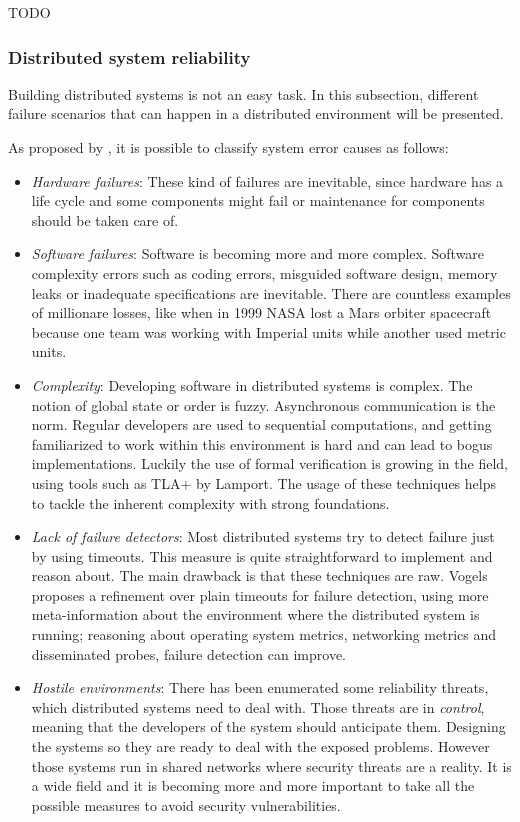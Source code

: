 TODO


\subsubsection{Distributed system reliability}

Building distributed systems is not an easy task. In this subsection, different
failure scenarios that can happen in a distributed environment will be presented.

As proposed by \cite{GuideReliable}, it is possible to classify system error
causes as follows:
\begin{itemize}
\item \textit{Hardware failures}: These kind of failures are inevitable, since
  hardware has a life cycle and some components might fail or maintenance for
  components should be taken care of.
\item \textit{Software failures}: Software is becoming more and more complex.
  Software complexity errors such as coding errors, misguided software design,
  memory leaks or inadequate specifications are inevitable. There are countless
  examples of millionare losses, like when in 1999 NASA lost a Mars orbiter
  spacecraft because one team was working with Imperial units while another used
  metric units.
\item \textit{Complexity}: Developing software in distributed systems is
  complex. The notion of global state or order is fuzzy. Asynchronous
  communication is the norm. Regular developers are used to sequential
  computations, and getting familiarized to work within this environment is hard
  and can lead to bogus implementations. Luckily the use of formal verification
  is growing in the field, using tools such as TLA+\cite{tla} by Lamport. The
  usage of these techniques helps to tackle the inherent complexity with strong
  foundations.
\item \textit{Lack of failure detectors}: Most distributed systems try to detect
  failure just by using timeouts. This measure is quite straightforward to
  implement and reason about. The main drawback is that these techniques are
  raw. Vogels \cite{vogels} proposes a refinement over plain timeouts for
  failure detection, using more meta-information about the environment where
  the distributed system is running; reasoning about operating system metrics,
  networking metrics and disseminated probes, failure detection can improve.
\item \textit{Hostile environments}: There has been enumerated some reliability
  threats, which distributed systems need to deal with. Those threats are in
  \textit{control}, meaning that the developers of the system should anticipate
  them. Designing the systems so they are ready to deal with the exposed
  problems. However those systems run in shared networks where security threats
  are a reality. It is a wide field and it is becoming more and more important
  to take all the possible measures to avoid security vulnerabilities.
\end{itemize}

